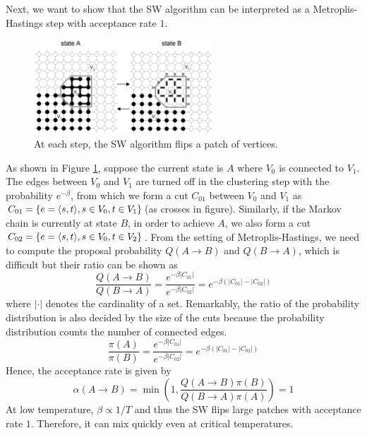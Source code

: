 \documentclass{article}
\begin{document}
Next, we want to show that the SW algorithm can be interpreted as a Metroplis-Hastings step with acceptance rate $1$.
\begin{figure}[h]
    \centering
    \includegraphics[width=0.6\textwidth]{figure/sw1.png}
    \caption{At each step, the SW algorithm flips a patch of vertices.}
    \label{fig:sw_onestep}
\end{figure}

As shown in Figure \ref{fig:sw_onestep}, suppose the current state is $A$ where $V_0$ is connected to $V_1$. The edges between $V_0$ and $V_1$ are turned off in the clustering step with the probability $e^{-\beta}$, from which we form a cut $C_{01}$ between $V_0$ and $V_1$ as $C_{01}=\{e=\langle s,t \rangle,s\in V_0,t\in V_1\}$(as crosses in figure). Similarly, if the Markov chain is currently at state $B$, in order to achieve $A$, we also form a cut $C_{02}=\{e=\langle s,t \rangle,s\in V_0,t\in V_2\}$. From the setting of Metroplis-Hastings, we need to compute the proposal probability $Q(A\to B)$ and $Q(B\to A)$, which is difficult but their ratio can be shown as 
\begin{equation}
\label{equ:proposal}
    \frac{Q(A\to B)}{Q(B\to A)}=\frac{e^{-\beta|C_{01}|}}{e^{-\beta|C_{02}|}}=e^{-\beta(|C_{01}|-|C_{02}|)}
\end{equation}
where $|\cdot|$ denotes the cardinality of a set. Remarkably, the ratio of the probability distribution is also decided by the size of the cuts because the probability distribution counts the number of connected edges.
\begin{equation}
    \frac{\pi(A)}{\pi(B)}=\frac{e^{-\beta|C_{01}|}}{e^{-\beta|C_{02}|}}=e^{-\beta(|C_{01}|-|C_{02}|)}
\end{equation}
Hence, the acceptance rate is given by
\begin{equation}
    \alpha(A\to B)=\min(1,\frac{Q(A\to B)\pi(B)}{Q(B\to A)\pi(A)})=1
\end{equation}
At low temperature, $\beta\propto 1/T$ and thus the SW flips large patches with acceptance rate $1$. Therefore, it can mix quickly even at critical temperatures. 
\end{document}
